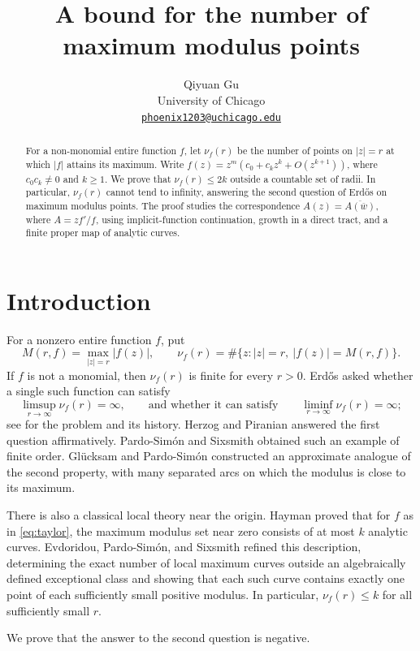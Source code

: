 \documentclass[11pt]{article}
\title{A bound for the number of maximum modulus points}
\author{Qiyuan Gu\\
University of Chicago\\
\href{mailto:phoenix1203@uchicago.edu}{\texttt{phoenix1203@uchicago.edu}}}
\date{}
\theoremstyle{remark}
\numberwithin{equation}{section}
\begin{document}
\maketitle

\begin{abstract}
For a non-monomial entire function \(f\), let \(\nu_f(r)\) be the
number of points on \(|z|=r\) at which \(|f|\) attains its maximum.
Write \(f(z)=z^m(c_0+c_kz^k+O(z^{k+1}))\), where
\(c_0c_k\ne0\) and \(k\ge1\).
We prove that \(\nu_f(r)\le2k\) outside a countable set of radii.
In particular, \(\nu_f(r)\) cannot tend to infinity, answering the
second question of Erd\H{o}s on maximum modulus points.
The proof studies the correspondence
\(A(z)=\overline{A(\overline w)}\), where \(A=zf'/f\), using
implicit-function continuation, growth in a direct tract, and a finite
proper map of analytic curves.
\end{abstract}

\section{Introduction}

For a nonzero entire function \(f\), put
\[
 M(r,f)=\max_{|z|=r}|f(z)|,
 \qquad
 \nu_f(r)=\#\{z:|z|=r,\ |f(z)|=M(r,f)\}.
\]
If \(f\) is not a monomial, then \(\nu_f(r)\) is finite for every
\(r>0\). Erd\H{o}s asked whether a single such function can satisfy
\[
 \limsup_{r\to\infty}\nu_f(r)=\infty,
 \qquad\text{and whether it can satisfy}\qquad
 \liminf_{r\to\infty}\nu_f(r)=\infty;
\]
see \cite{Erdos1117,GP} for the problem and its history.
Herzog and Piranian \cite{HP} answered the first question affirmatively.
Pardo-Sim\'on and Sixsmith \cite{PS} obtained such an example of finite
order. Gl\"ucksam and Pardo-Sim\'on \cite{GP} constructed an approximate
analogue of the second property, with many separated arcs on which
the modulus is close to its maximum.

There is also a classical local theory near the origin. Hayman
\cite{Hayman} proved that for \(f\) as in \eqref{eq:taylor}, the
maximum modulus set near zero consists of at most \(k\) analytic
curves. Evdoridou, Pardo-Sim\'on, and Sixsmith \cite{EPS} refined
this description, determining the exact number of local maximum
curves outside an algebraically defined exceptional class and showing
that each such curve contains exactly one point of each sufficiently
small positive modulus. In particular, \(\nu_f(r)\le k\) for all
sufficiently small \(r\).

We prove that the answer to the second question is negative.
\end{document}
